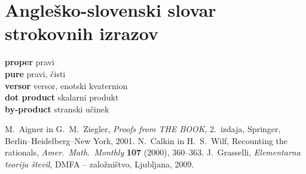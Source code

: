 \documentclass[a4paper,12pt]{article}
\def\N{\mathbb{N}} %
\newcommand{\geslo}[2]{\noindent\textbf{#1} \quad \hangindent=1cm #2\\[-1pc]}
\begin{document}


\section*{Angleško-slovenski slovar strokovnih izrazov}

\geslo{proper}{pravi}

\geslo{pure}{pravi, čisti}

\geslo{versor}{versor, enotski kvaternion}

\geslo{dot product}{skalarni produkt}

\geslo{by-product}{stranski učinek}




\begin{thebibliography}{1}
M.~Aigner in G.~M.~Ziegler, \emph{Proofs from THE BOOK}, 2.\ izdaja, Springer, Berlin--Heidelberg--New York, 2001.
N.~Calkin in H.~S.~Wilf, Recounting the rationals,
\emph{Amer.~Math.~Monthly}  \textbf{107}  (2000),  360--363.
J.~Grasselli, \emph{Elementarna teorija števil}, DMFA -- založništvo, Ljubljana, 2009.
\end{thebibliography}
\end{document}
